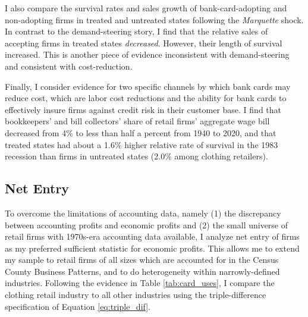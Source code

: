 \documentclass[12pt,english]{article}
\begin{document}
I also compare the survival rates and sales growth of bank-card-adopting and non-adopting firms in treated and untreated states following the \emph{Marquette} shock. In contrast to the demand-steering story, I find that the relative sales of accepting firms in treated states \emph{decreased}. However, their length of survival increased. This is another piece of evidence inconsistent with demand-steering and consistent with cost-reduction. 


Finally, I consider evidence for two specific channels by which bank cards may reduce cost, which are labor cost reductions and the ability for bank cards to effectively insure firms against credit risk in their customer base. I find that bookkeepers' and bill collectors' share of retail firms' aggregate wage bill decreased from 4\% to less than half a percent from 1940 to 2020, and that treated states had about a 1.6\% higher relative rate of survival in the 1983 recession than firms in untreated states (2.0\% among clothing retailers).

\subsection{Net Entry}\label{subsec:net_entry}

To overcome the limitations of accounting data, namely (1) the discrepancy between accounting profits and economic profits and (2) the small universe of retail firms with 1970s-era accounting data available, I analyze net entry of firms as my preferred sufficient statistic for economic profits. This allows me to extend my sample to retail firms of all sizes which are accounted for in the Census County Business Patterns, and to do heterogeneity within narrowly-defined industries. Following the evidence in Table \ref{tab:card_uses}, I compare the clothing retail industry to all other industries using the triple-difference specification of Equation \ref{eq:triple_dif}. 

\end{document}

